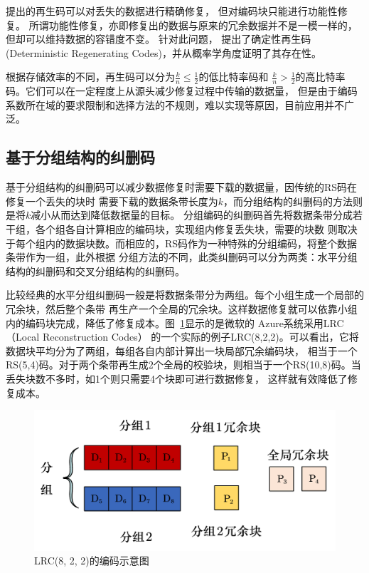 \citet{dimakis2010network}提出的再生码可以对丢失的数据进行精确修复，
但对编码块只能进行功能性修复。
所谓功能性修复，亦即修复出的数据与原来的冗余数据并不是一模一样的，但却可以维持数据的容错度不变。
针对此问题，
\citet{wu2007deterministic}提出了确定性再生码
(Deterministic Regenerating Codes)，并从概率学角度证明了其存在性。

根据存储效率的不同，再生码可以分为$\frac{k}{n}\leqslant \frac{1}{2}$的低比特率码和
$\frac{k}{n}> \frac{1}{2}$的高比特率码。它们可以在一定程度上从源头减少修复过程中传输的数据量，
但是由于编码系数所在域的要求限制和选择方法的不规则，难以实现等原因，目前应用并不广泛。


\subsection{基于分组结构的纠删码}
基于分组结构的纠删码可以减少数据修复时需要下载的数据量，因传统的RS码在修复一个丢失的块时
需要下载的数据条带长度为$k$，而分组结构的纠删码的方法则是将$k$减小从而达到降低数据量的目标。
分组编码的纠删码首先将数据条带分成若干组，各个组各自计算相应的编码块，实现组内修复丢失块，需要的块数
则取决于每个组内的数据块数。而相应的，RS码作为一种特殊的分组编码，将整个数据条带作为一组，此外根据
分组方法的不同，此类纠删码可以分为两类：水平分组结构的纠删码和交叉分组结构的纠删码。

比较经典的水平分组纠删码一般是将数据条带分为两组。每个小组生成一个局部的冗余块，然后整个条带
再生产一个全局的冗余块。这样数据修复就可以依靠小组内的编码块完成，降低了修复成本。图~\ref{fig:con-1.7}显示的是微软的
Azure系统\cite{calder2011windows}采用LRC（Local Reconstruction Codes）\cite{huang2012erasure}
的一个实际的例子LRC(8,2,2)。可以看出，它将数据块平均分为了两组，每组各自内部计算出一块局部冗余编码块，
相当于一个RS(5,4)码。对于两个条带再生成2个全局的校验块，则相当于一个RS(10,8)码。当丢失块数不多时，如1个则只需要4个块即可进行数据修复，
这样就有效降低了修复成本。

\begin{figure}[htbp]
	\centering
	\includegraphics [scale=0.5]{figures/1.7.pdf}
	\caption{LRC(8, 2, 2)的编码示意图}
	\label{fig:con-1.7}
\end{figure}

